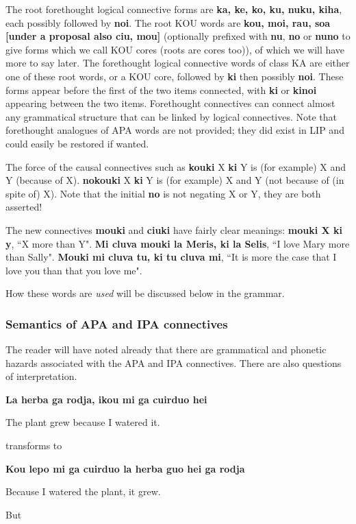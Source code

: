 \documentclass[12pt]{book}
\begin{document}
{The root forethought logical connective forms are {\bf ka, ke, ko, ku, nuku, kiha}, each  possibly followed by {\bf noi}.   The root KOU words are {\bf kou, moi, rau, soa [under a proposal also ciu, mou]} (optionally prefixed with {\bf nu}, {\bf no} or {\bf nuno} to give forms which we call KOU cores (roots are cores too)), of which we will have more to say later.
The forethought logical connective words of class KA are either one of these root words, or a KOU core, followed by {\bf ki} then possibly {\bf noi}.   These forms appear before the first of the two items connected, with {\bf ki} or {\bf kinoi} appearing between the two items.   Forethought connectives can connect almost any grammatical structure that can be linked by logical connectives.   Note that forethought analogues of APA words are not provided; they did exist in LIP and could easily be restored if wanted.

The force of the causal connectives such as {\bf kouki} X {\bf ki} Y is (for example)  X and Y (because of X).   {\bf nokouki} X {\bf ki} Y is (for example)  X and Y (not because of (in spite of) X).  Note
that the initial {\bf no} is not negating X or Y, they are both asserted!  

The new connectives {\bf mouki} and {\bf ciuki}  have fairly clear meanings:  {\bf mouki X ki y}, ``X more than Y".  {\bf Mi cluva mouki la Meris, ki la Selis}, ``I love Mary more than Sally".  {\bf Mouki mi cluva tu, ki tu cluva mi}, ``It is more the case that I love you than that you love me".

How these words are {\em used\/} will be discussed below in the grammar.

\subsubsection{Semantics of APA and IPA connectives}

The reader will have noted already that there are grammatical and phonetic hazards associated with the APA and IPA connectives.  There are also questions of interpretation.

{\bf La herba ga rodja, ikou mi ga cuirduo hei}

The plant grew because I watered it.

transforms to

{\bf Kou lepo mi ga cuirduo la herba guo hei ga rodja}

Because I watered the plant, it grew.

But

}
\end{document}
